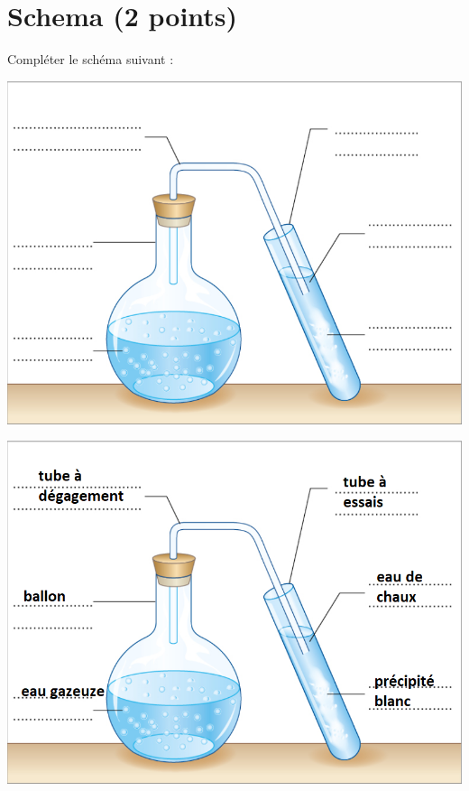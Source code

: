 \section{Schema (2 points)}\label{ex_schema}

Compléter le schéma suivant :

\begin{center}
	\includegraphics[scale=0.7]{img/gaz}
\end{center}

\begin{solution}
	\begin{center}
		\includegraphics[scale=0.5]{img/gaz_2}
	\end{center}
\end{solution}